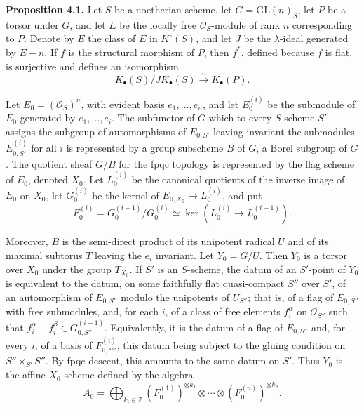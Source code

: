 \documentclass[11pt]{article}
\begin{document}
\textbf{Proposition 4.1.} Let $S$ be a noetherian scheme, let $G=\mathrm{GL}(n)_S$, let $P$ be a torsor under $G$, and let $E$ be the locally free $\mathcal O_S$-module of rank $n$ corresponding to $P$. Denote by $E$ the class of $E$ in $K^\circ(S)$, and let $J$ be the $\lambda$-ideal generated by $E-n$. If $f$ is the structural morphism of $P$, then $f^*$, defined because $f$ is flat, is surjective and defines an isomorphism
\[
 K_\bullet(S)/J K_\bullet(S)\xrightarrow{\sim}K_\bullet(P).
\]

Let $E_0=(\mathcal O_S)^n$, with evident basis $e_1,\ldots,e_n$, and let $E_0^{(i)}$ be the submodule of $E_0$ generated by $e_1,\ldots,e_i$. The subfunctor of $G$ which to every $S$-scheme $S'$ assigns the subgroup of automorphisms of $E_{0,S'}$ leaving invariant the submodules $E_{0,S'}^{(i)}$ for all $i$ is represented by a group subscheme $B$ of $G$, a Borel subgroup of $G$. The quotient sheaf $G/B$ for the fpqc topology is represented by the flag scheme of $E_0$, denoted $X_0$. Let $L_0^{(i)}$ be the canonical quotients of the inverse image of $E_0$ on $X_0$, let $G_0^{(i)}$ be the kernel of $E_{0,X_0}\to L_0^{(i)}$, and put
\[
 F_0^{(i)}=G_0^{(i-1)}/G_0^{(i)}\simeq \ker(L_0^{(i)}\to L_0^{(i-1)}).
\]

Moreover, $B$ is the semi-direct product of its unipotent radical $U$ and of its maximal subtorus $T$ leaving the $e_i$ invariant. Let $Y_0=G/U$. Then $Y_0$ is a torsor over $X_0$ under the group $T_{X_0}$. If $S'$ is an $S$-scheme, the datum of an $S'$-point of $Y_0$ is equivalent to the datum, on some faithfully flat quasi-compact $S''$ over $S'$, of an automorphism of $E_{0,S''}$ modulo the unipotents of $U_{S''}$; that is, of a flag of $E_{0,S''}$ with free submodules, and, for each $i$, of a class of free elements $f_i^\alpha$ on $\mathcal O_{S''}$ such that $f_i^\alpha-f_i^\beta\in G_{0,S''}^{(i+1)}$. Equivalently, it is the datum of a flag of $E_{0,S''}$ and, for every $i$, of a basis of $F_{0,S''}^{(i)}$, this datum being subject to the gluing condition on $S''\times_{S'}S''$. By fpqc descent, this amounts to the same datum on $S'$. Thus $Y_0$ is the affine $X_0$-scheme defined by the algebra
\[
 A_0=\bigoplus_{k_i\in\mathbb Z}(F_0^{(1)})^{\otimes k_1}\otimes\cdots\otimes(F_0^{(n)})^{\otimes k_n}.
\]
\end{document}
